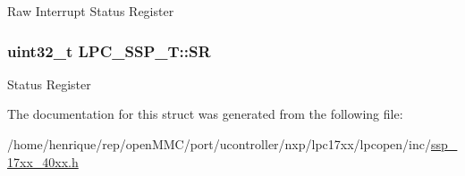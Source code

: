 Raw Interrupt Status Register \hypertarget{structLPC__SSP__T_a5f6421682b9a321abc8d4c91a6dbd964}{
\subsubsection[{S\-R}]{ uint32\-\_\-t L\-P\-C\-\_\-\-S\-S\-P\-\_\-\-T\-::\-S\-R}}\label{structLPC__SSP__T_a5f6421682b9a321abc8d4c91a6dbd964}
Status Register 

The documentation for this struct was generated from the following file\-:\begin{DoxyCompactItemize}
\item 
/home/henrique/rep/open\-M\-M\-C/port/ucontroller/nxp/lpc17xx/lpcopen/inc/\hyperlink{ssp__17xx__40xx_8h}{ssp\-\_\-17xx\-\_\-40xx.\-h}\end{DoxyCompactItemize}
